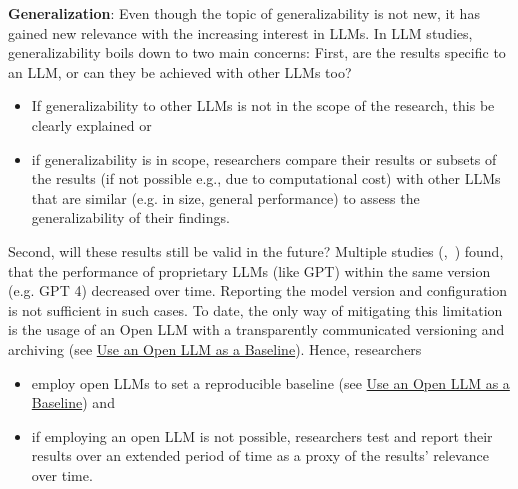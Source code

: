 \textbf{Generalization}:
Even though the topic of generalizability is not new, it has gained new relevance with the increasing interest in LLMs. In LLM studies, generalizability boils down to two main concerns:
First, are the results specific to an LLM, or can they be achieved with other LLMs too? 
\begin{itemize}
  \item If generalizability to other LLMs is not in the scope of the research, this \must be clearly explained or
  \item if generalizability is in scope, researchers \must compare their results or subsets of the results (if not possible e.g., due to computational cost) with other LLMs that are similar (e.g. in size, general performance) to assess the generalizability of their findings. %
\end{itemize}
Second, will these results still be valid in the future? Multiple studies (\cite{DBLP:journals/corr/abs-2307-09009},~\cite{doi:10.1148/radiol.232411}) found, that the performance of proprietary LLMs (like GPT) within the same version (e.g. GPT 4) decreased over time. Reporting the model version and configuration is not sufficient in such cases. To date, the only way of mitigating this limitation is the usage of an Open LLM with a transparently communicated versioning and archiving (see \href{/guidelines/#use-open-llm}{Use an Open LLM as a Baseline}). Hence, researchers
\begin{itemize}
  \item \should employ open LLMs to set a reproducible baseline (see \href{/guidelines/#use-open-llm}{Use an Open LLM as a Baseline}) and
  \item if employing an open LLM is not possible, researchers \should test and report their results over an extended period of time as a proxy of the results' relevance over time.
\end{itemize}

